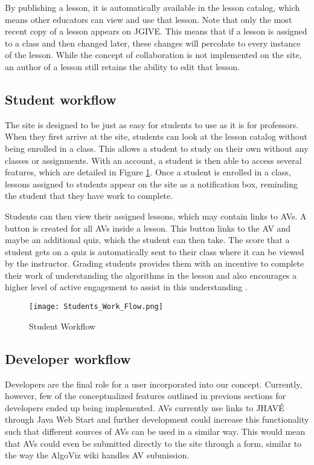 \documentclass{acm_proc_article-sp}
\begin{document}
By publishing a lesson, it is automatically available in the lesson catalog, which means other educators can view and use that lesson. Note that only the most recent copy of a lesson appears on JGIVE. This means that if a lesson is assigned to a class and then changed later, these changes will percolate to every instance of the lesson. While the concept of collaboration is not implemented on the site, an author of a lesson still retains the ability to edit that lesson.

\subsection{Student workflow}
The site is designed to be just as easy for students to use as it is for professors. When they first arrive at the site, students can look at the lesson catalog without being enrolled in a class. This allows a student to study on their own without any classes or assignments. With an account, a student is then able to access several features, which are detailed in Figure \ref{fig:Student Work Flow}. Once a student is enrolled in a class, lessons assigned to students appear on the site as a notification box, reminding the student that they have work to complete.

Students can then view their assigned lessons, which may contain links to AVs. A button is created for all AVs inside a lesson. This button links to the AV and maybe an additional quiz, which the student can then take. The score that a student gets on a quiz is automatically sent to their class where it can be viewed by the instructor. Grading students provides them with an incentive to complete their work of understanding the algorithms in the lesson and also encourages a higher level of active engagement to assist in this understanding \cite{jhave}.

\begin{figure}[h]
  \begin{center}
    \texttt{[image: Students\_Work\_Flow.png]}
  \end{center}
  \caption{Student Workflow}
  \label{fig:Student Work Flow}
\end{figure}

\subsection{Developer workflow}
\label{Developer workflow}
Developers are the final role for a user incorporated into our concept. Currently, however, few of the conceptualized features outlined in previous sections for developers ended up being implemented. AVs currently use links to JHAV\'{E} through Java Web Start and further development could increase this functionality such that different sources of AVs can be used in a similar way. This would mean that AVs could even be submitted directly to the site through a form, similar to the way the AlgoViz wiki handles AV submission.
\end{document}
